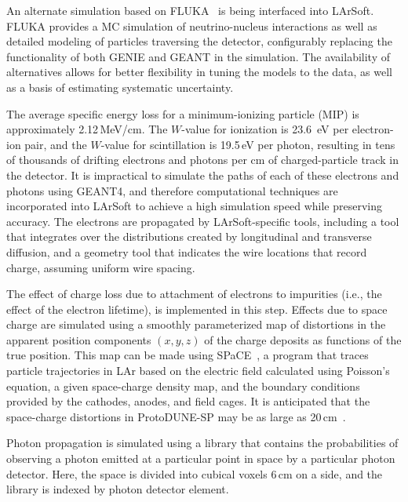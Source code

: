 An alternate simulation based on FLUKA~\cite{Fluka15, Ferrari:2005zk, Battistoni:2009zzb} 
is being interfaced into LArSoft.
FLUKA provides a MC simulation of neutrino-nucleus interactions as well as
detailed modeling of particles traversing the detector, configurably replacing the
functionality of both GENIE and GEANT in the simulation.  The availability of alternatives
allows for better flexibility in tuning the models to the data, as well as a basis of
estimating systematic uncertainty.

The average specific energy loss for a minimum-ionizing particle (MIP)
is approximately 2.12\,MeV/cm.  The $W$-value for ionization is 23.6~eV
per electron-ion pair, and the $W$-value for scintillation is 19.5\,eV
per photon, resulting in tens of thousands of drifting electrons and
photons per cm of charged-particle track in the detector.  It is
impractical to simulate the paths of each of these electrons and 
photons using GEANT4, and therefore computational techniques are incorporated
into LArSoft to achieve a high simulation speed while preserving
accuracy.  The electrons are propagated by LArSoft-specific tools,
including a tool that integrates over the distributions created by longitudinal
and transverse diffusion, 
and a geometry tool that indicates the wire locations that record charge, assuming uniform wire spacing.

The effect of charge loss due to attachment
of electrons to impurities (i.e., the effect of the electron lifetime),  is
implemented in this step.  
Effects due to space charge are simulated using a smoothly parameterized
map of
distortions in the apparent position components $(x,y,z)$ of the charge
deposits as
functions of the true position.
This map can be made using SPaCE~\cite{Mooney:2015kke}, a
program that traces particle trajectories in LAr based on the
electric field calculated using Poisson's equation, a given
space-charge density map, and the boundary conditions provided by the
cathodes, anodes, and field cages.  It is anticipated that the
space-charge distortions in ProtoDUNE-SP may be as large as
20\,cm~\cite{Mooney:2015kke}. 


Photon propagation is simulated using a library that contains the
probabilities of observing a photon emitted at a particular point in
space by a particular photon detector.  Here, the space is divided
into cubical voxels 6\,cm on a side, and the library is indexed by photon
detector element. 


